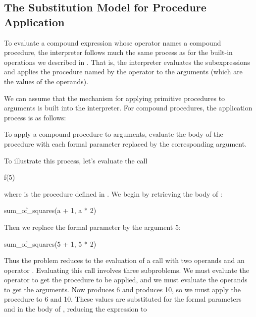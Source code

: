 \subsection{The Substitution Model for Procedure Application}
\label{Section 1.1.5}

To evaluate a compound expression whose operator names a compound procedure, the
interpreter follows much the same process as for the built-in operations we
described in .  That is, the interpreter evaluates the
subexpressions and applies the procedure named by the operator to the arguments
(which are the values of the operands).

We can assume that the mechanism for applying primitive procedures to arguments
is built into the interpreter.  For compound procedures, the application
process is as follows:

\begin{niceQuote}
To apply a compound procedure to arguments, evaluate the body of the procedure
with each formal parameter replaced by the corresponding argument.
\end{niceQuote}

\noindent
To illustrate this process, let's evaluate the call

\begin{syntaxForm}
f(5)
\end{syntaxForm}

\noindent
where  is the procedure defined in .  We begin by
retrieving the body of :

\begin{syntaxForm}
sum_of_squares(a + 1, a * 2)
\end{syntaxForm}

\noindent
Then we replace the formal parameter  by the argument 5:

\begin{syntaxForm}
sum_of_squares(5 + 1, 5 * 2)
\end{syntaxForm}

\noindent
Thus the problem reduces to the evaluation of a call with two operands and an
operator .  Evaluating this call involves three
subproblems.  We must evaluate the operator to get the procedure to be applied,
and we must evaluate the operands to get the arguments.  Now 
produces 6 and  produces 10, so we must apply the
 procedure to 6 and 10.  These values are substituted for
the formal parameters  and  in the body of
, reducing the expression to


